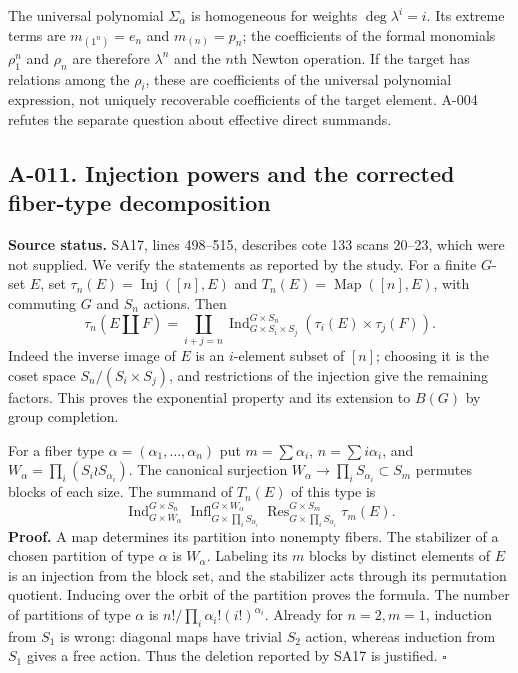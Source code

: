 The universal polynomial $\Sigma_\alpha$ is homogeneous for weights
$\deg\lambda^i=i$. Its extreme terms are $m_{(1^n)}=e_n$ and
$m_{(n)}=p_n$; the coefficients of the formal monomials $\rho_1^n$
and $\rho_n$ are therefore $\lambda^n$ and the $n$th Newton operation.
If the target has relations among the $\rho_i$, these are coefficients
of the universal polynomial expression, not uniquely recoverable
coefficients of the target element. A-004 refutes the separate question
about effective direct summands.

\subsection*{A-011. Injection powers and the corrected fiber-type decomposition}
\textbf{Source status.} SA17, lines 498--515, describes cote 133 scans
20--23, which were not supplied. We verify the statements as reported
by the study. For a finite $G$-set $E$, set
$\tau_n(E)=\operatorname{Inj}([n],E)$ and
$T_n(E)=\operatorname{Map}([n],E)$, with commuting $G$ and $S_n$ actions.
Then
\[
 \tau_n(E\amalg F)=\coprod_{i+j=n}
 \operatorname{Ind}_{G\times S_i\times S_j}^{G\times S_n}
       (\tau_i(E)\times\tau_j(F)).
\]
Indeed the inverse image of $E$ is an $i$-element subset of $[n]$;
choosing it is the coset space $S_n/(S_i\times S_j)$, and restrictions
of the injection give the remaining factors. This proves the
exponential property and its extension to $B(G)$ by group completion.

For a fiber type $\alpha=(\alpha_1,\ldots,\alpha_n)$ put
$m=\sum\alpha_i$, $n=\sum i\alpha_i$, and
$W_\alpha=\prod_i(S_i\wr S_{\alpha_i})$. The canonical surjection
$W_\alpha\to\prod_iS_{\alpha_i}\subset S_m$ permutes blocks of
each size. The summand of $T_n(E)$ of this type is
\[
 \operatorname{Ind}_{G\times W_\alpha}^{G\times S_n}
 \operatorname{Infl}_{G\times\prod_iS_{\alpha_i}}^{G\times W_\alpha}
 \operatorname{Res}_{G\times\prod_iS_{\alpha_i}}^{G\times S_m}
 \tau_m(E).
\]
\textbf{Proof.} A map determines its partition into nonempty fibers.
The stabilizer of a chosen partition of type $\alpha$ is $W_\alpha$.
Labeling its $m$ blocks by distinct elements of $E$ is an injection
from the block set, and the stabilizer acts through its permutation
quotient. Inducing over the orbit of the partition proves the formula.
The number of partitions of type $\alpha$ is
$n!/\prod_i\alpha_i!(i!)^{\alpha_i}$. Already for $n=2,m=1$,
induction from $S_1$ is wrong: diagonal maps have trivial $S_2$ action,
whereas induction from $S_1$ gives a free action. Thus the deletion
reported by SA17 is justified. \hfill$\square$

